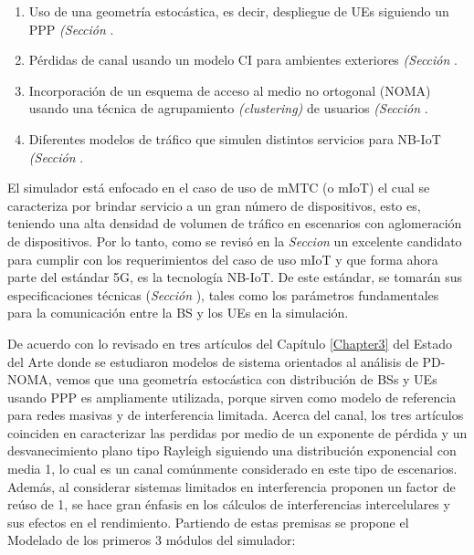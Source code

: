 \begin{enumerate}
    \item  Uso de una geometría estocástica, es decir, despliegue de UEs siguiendo un PPP \textit{(Sección }.
    \item  Pérdidas de canal usando un modelo CI para ambientes exteriores \textit{(Sección }.
    \item  Incorporación de un esquema de acceso al medio no ortogonal (NOMA) usando una técnica de agrupamiento \textit{(clustering)} de usuarios \textit{(Sección }.
    \item  Diferentes modelos de tráfico que simulen distintos servicios para NB-IoT \textit{(Sección }.
\end{enumerate}

El simulador está enfocado en el caso de uso de mMTC (o mIoT) el cual se caracteriza por brindar servicio a un gran número de dispositivos, esto es, teniendo una alta densidad de volumen de tráfico en escenarios con aglomeración de dispositivos. Por lo tanto, como se revisó en la \textit{Seccion } un excelente candidato para cumplir con los requerimientos del caso de uso mIoT y que forma ahora parte del estándar 5G, es la tecnología NB-IoT. De este estándar, se tomarán sus especificaciones técnicas (\textit{Sección }), tales como los parámetros fundamentales para la comunicación entre la BS y los UEs en la simulación.\newline

De acuerdo con lo revisado en tres artículos del Capítulo \ref{Chapter3} del Estado del Arte \parencite{Kouzayha2018} \parencite{Zhang2017} \parencite{Shahini2019} donde se estudiaron modelos de sistema orientados al análisis de PD-NOMA, vemos que una geometría estocástica con distribución de BSs y UEs usando PPP es ampliamente utilizada, porque sirven como modelo de referencia para redes masivas y de interferencia limitada. Acerca del canal, los tres artículos coinciden en caracterizar las perdidas por medio de un exponente de pérdida y un desvanecimiento plano tipo Rayleigh siguiendo una distribución exponencial con media 1, lo cual es un canal comúnmente considerado en este tipo de escenarios. Además, al considerar sistemas limitados en interferencia proponen un factor de reúso de 1, se hace gran énfasis en los cálculos de interferencias intercelulares y sus efectos en el rendimiento. Partiendo de estas premisas se propone el Modelado de los primeros 3 módulos del simulador:

